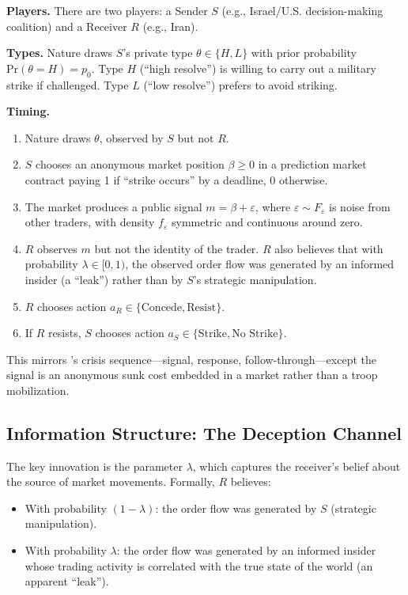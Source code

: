 \documentclass[12pt]{article}
\newcommand{\Pr}{\text{Pr}}
\begin{document}
\textbf{Players.} There are two players: a Sender $S$ (e.g., Israel/U.S. decision-making coalition) and a Receiver $R$ (e.g., Iran).

\textbf{Types.} Nature draws $S$'s private type $\theta \in \{H, L\}$ with prior probability $\Pr(\theta = H) = p_0$. Type $H$ (``high resolve'') is willing to carry out a military strike if challenged. Type $L$ (``low resolve'') prefers to avoid striking.

\textbf{Timing.}
\begin{enumerate}
    \item Nature draws $\theta$, observed by $S$ but not $R$.
    \item $S$ chooses an anonymous market position $\beta \geq 0$ in a prediction market contract paying 1 if ``strike occurs'' by a deadline, 0 otherwise.
    \item The market produces a public signal $m = \beta + \varepsilon$, where $\varepsilon \sim F_\varepsilon$ is noise from other traders, with density $f_\varepsilon$ symmetric and continuous around zero.
    \item $R$ observes $m$ but not the identity of the trader. $R$ also believes that with probability $\lambda \in [0,1)$, the observed order flow was generated by an informed insider (a ``leak'') rather than by $S$'s strategic manipulation.
    \item $R$ chooses action $a_R \in \{\text{Concede}, \text{Resist}\}$.
    \item If $R$ resists, $S$ chooses action $a_S \in \{\text{Strike}, \text{No Strike}\}$.
\end{enumerate}

This mirrors \citet{fearon1997}'s crisis sequence---signal, response, follow-through---except the signal is an anonymous sunk cost embedded in a market rather than a troop mobilization.

\subsection{Information Structure: The Deception Channel}

The key innovation is the parameter $\lambda$, which captures the receiver's belief about the source of market movements. Formally, $R$ believes:
\begin{itemize}
    \item With probability $(1-\lambda)$: the order flow was generated by $S$ (strategic manipulation).
    \item With probability $\lambda$: the order flow was generated by an informed insider whose trading activity is correlated with the true state of the world (an apparent ``leak'').
\end{itemize}
\end{document}
